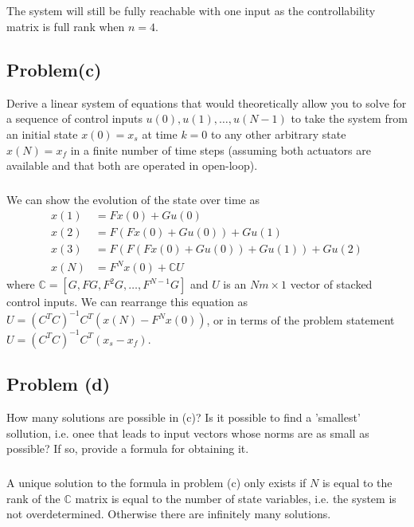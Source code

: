 \documentclass[11pt]{article}
\begin{document}
\subparagraph*{}
The system will still be fully reachable with one input as the controllability matrix is full rank when $n=4$. 

\subsection*{Problem(c)}
Derive a linear system of equations that would theoretically allow you to solve for a sequence of control inputs $u(0),u(1),\dots,u(N-1)$ to take the system from an initial state $x(0)=x_s$ at time $k=0$ to any other arbitrary state $x(N)=x_f$ in a finite number of time steps (assuming both actuators are available and that both are operated in open-loop).

\subparagraph*{}
We can show the evolution of the state over time as
\begin{align*}
	x(1) &= Fx(0) + Gu(0) \\
	x(2) &= F(Fx(0)+Gu(0)) + Gu(1) \\
	x(3) &= F(F(Fx(0)+Gu(0))+Gu(1)) + Gu(2) \\
	x(N) &= F^Nx(0) + \mathbb{C}U
\end{align*}
where $\mathbb{C}=[G,FG,F^2G,\dots,F^{N-1}G]$ and $U$ is an $Nm\times1$ vector of stacked control inputs. We can rearrange this equation as $U=(C^TC)^{-1}C^T(x(N)-F^Nx(0))$, or in terms of the problem statement $U=(C^TC)^{-1}C^T(x_s-x_f)$. 

\subsection*{Problem (d)}
How many solutions are possible in (c)? Is it possible to find a 'smallest' sollution, i.e. onee that leads to input vectors whose norms are as small as possible? If so, provide a formula for obtaining it.

\subparagraph*{}
A unique solution to the formula in problem (c) only exists if $N$ is equal to the rank of the $\mathbb{C}$ matrix is equal to the number of state variables, i.e. the system is not overdetermined. Otherwise there are infinitely many solutions.
\end{document}
